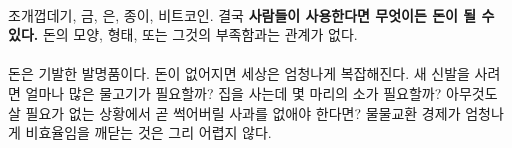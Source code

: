 
\paragraph{}
조개껍데기, 금, 은, 종이, 비트코인. 결국 \textbf{사람들이 사용한다면 무엇이든 돈이 될 수 있다.}
돈의 모양, 형태, 또는 그것의 부족함과는 관계가 없다.


\paragraph{}
돈은 기발한 발명품이다.
돈이 없어지면 세상은 엄청나게 복잡해진다.
새 신발을 사려면 얼마나 많은 물고기가 필요할까? 
집을 사는데 몇 마리의 소가 필요할까? 
아무것도 살 필요가 없는 상황에서 곧 썩어버릴 사과를 없애야 한다면? 
물물교환 경제가 엄청나게 비효율임을 깨닫는 것은 그리 어렵지 않다.



\begin{comment}
	돈의 가장 큰 장점은 무엇과도 교환할 수 있다는 것이다. 정말 대단한 발명품이다. 
	닉 재보\footnote{\url{http://unenumerated.blogspot.com/}}는 
	셸링 아웃: 화폐의 기원(Shelling out\footnote{역자: Shell out은 '지불하다.'라는 뜻으로 쓰이는데, 조개(shell)를 지불하는 데서 유래되었다고 한다.}: The Origins of Money)\cite{shelling-out}에서 
	이에 대해 훌륭하게 요약했다.
	\enquote{우리 인간은 상아, 조개, 특수 뼈와 같은 희귀한 재료로 만든 구슬, 다양한 종류의 장신구, 
		나중에는 은과 금과 같은 희귀 금속까지 모든 종류의 것을 돈으로 사용했다.}
\end{comment}


